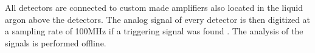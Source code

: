 \documentclass[encoding=utf8,british]{tumphthesis}
\begin{document}
All detectors are connected to custom made amplifiers also located in the liquid argon above the detectors.
The analog signal of every detector is then digitized at a sampling rate of 100MHz if a triggering signal was found \cite{riboldi_cryogenic_2015}.
The analysis of the signals is performed offline.
\\

\end{document}
